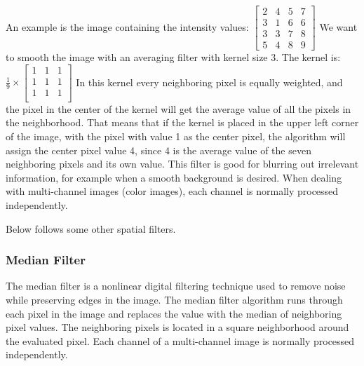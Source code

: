 An example is the image containing the intensity values: 
$\begin{bmatrix}
    2 & 4 & 5 & 7 \\
    3 & 1 & 6 & 6 \\
    3 & 3 & 7 & 8 \\
    5 & 4 & 8 & 9 
\end{bmatrix}$
\newline
We want to smooth the image with an averaging filter with kernel size 3. The kernel is: 
$\frac{1}{9} \times 
\begin{bmatrix}
    1 & 1 & 1 \\
    1 & 1 & 1 \\
    1 & 1 & 1 \\
\end{bmatrix}$
In this kernel every neighboring pixel is equally weighted, and the pixel in the center of the kernel will get the average value of all the pixels in the neighborhood. That means that if the kernel is placed in the upper left corner of the image, with the pixel with value 1 as the center pixel, the algorithm will assign the center pixel value 4, since 4 is the average value of the seven neighboring pixels and its own value.
This filter is good for blurring out irrelevant information, for example when a smooth background is desired.
When dealing with multi-channel images (color images), each channel is normally processed independently.

Below follows some other spatial filters.


\subsubsection{Median Filter}
The median filter is a nonlinear digital filtering technique used to remove noise while preserving edges in the image. The median filter algorithm runs through each pixel in the image and replaces the value with the median of neighboring pixel values. The neighboring pixels is located in a square neighborhood around the evaluated pixel. Each channel of a multi-channel image is normally processed independently.\cite{book:digital_image_processing}\cite{website:wiki_median_filter}\cite{book:machine_vision}

